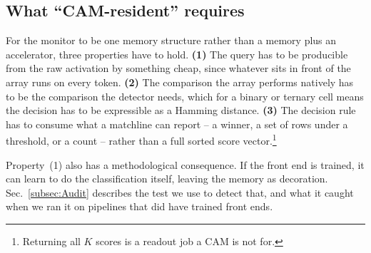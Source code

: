 \documentclass[conference]{IEEEtran}
\newcommand{\cam}{{CAM}\xspace}
\begin{document}
\subsection{What ``CAM-resident'' requires}
\label{subsec:Requirements}
For the monitor to be one memory structure rather than a memory plus an
accelerator, three properties have to hold. {\bf (1)} The query has to
be producible from the raw activation by something cheap, since whatever
sits in front of the array runs on every token. {\bf (2)} The comparison
the array performs natively has to be the comparison the detector needs,
which for a binary or ternary cell means the decision has to be
expressible as a Hamming distance. {\bf (3)} The decision rule has to
consume what a matchline can report -- a winner, a set of rows under a
threshold, or a count -- rather than a full sorted score
vector.\footnote{Returning all $K$ scores is a readout job a \cam is
not for.}

Property~(1) also has a methodological consequence. If the front end is
trained, it can learn to do the classification itself, leaving the
memory as decoration. Sec.~\ref{subsec:Audit} describes the test we
use to detect that, and what it caught when we ran it on pipelines
that did have trained front ends.
\end{document}
